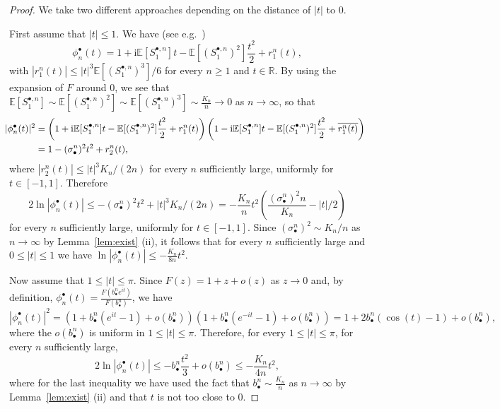 \documentclass[AHL,XML,longabstracts,Unicode]{cedram}
\newcommand{\E}{\mathbb{E}}
\newcommand{\R}{\mathbb{R}}
\def\bbn{b_{\bullet}^{n}}
\def\sbn{\sigma_{\bullet}^{n}}
\def\Sbn{S^{\bullet,n}}
\def\phibn{\phi^{\bullet}_{n}}
\begin{document}
\begin{proof}
We take two different approaches depending on the distance of $|t|$ to $0$.

First assume that $|t| \leq 1$. We have (see e.g.~\cite[Lemma 3.3.7]{Dur10})
\[\phibn(t)=1+\textrm{i}\E[\Sbn_{1}]t- \E[(\Sbn_{1})^{2}] \frac{t^{2}}{2}+r^{n}_{1}(t),\]
with $|r^{n}_{1}(t)| \leq |t|^{3} \E[(\Sbn_{1})^{3}]/6$ for every $n \geq 1$ and $t \in \R$. By using the expansion of $F$ around $0$, we see that $ \E[\Sbn_{1}] \sim \E[(\Sbn_{1})^{2}] \sim \E[(\Sbn_{1})^{3}] \sim \frac{K_{n}}{n} \rightarrow 0$ as $n \rightarrow \infty$, so that
\begin{align*}
  \hspace{ -2mm} |\phibn(t)|^{2} &= \left( 1+\textrm{i}\E[\Sbn_{1}]t- \E[(\Sbn_{1})^{2}] \frac{t^{2}}{2}+r^{n}_{1}(t) \right) \left( 1-\textrm{i}\E[\Sbn_{1}]t- \E[(\Sbn_{1})^{2}] \frac{t^{2}}{2}+\overline{r^{n}_{1}(t)} \right)\\
&= 1 - (\sbn)^{2} t^{2}+r^{n}_{2}(t),
\end{align*}
where $|r^{n}_{2}(t)| \leq  |t|^{3} K_{n}/(2n)$ for every $n$ sufficiently large, uniformly for $t \in [-1,1]$.
Therefore
\[ 2 \ln |\phibn(t)| \leq - (\sbn)^{2} t^{2}+ |t|^{3} K_{n}/(2n)= - \frac{K_{n}}{n} t^{2} \left(  \frac{(\sbn)^{2} n}{K_{n}}-|t|/2 \right)
\]
for every $n$ sufficiently large, uniformly for $t \in [-1,1]$.
Since $(\sbn)^{2} \sim K_{n}/n$ as $n \rightarrow \infty$ by Lemma~\ref{lem:exist} (ii), it follows that for every $n$ sufficiently large and $0 \leq |t| \leq 1$ we have $ \ln | \phibn (t)| \leq -  \frac{K_{n}}{ 8n} t^{2}$.

Now assume that $1 \leq |t| \leq \pi$. Since $F(z)=1+z+o(z)$ as $z \rightarrow 0$ and, by definition, $\phibn(t)=\tfrac{F( \bbn e^{it})}{F(\bbn)}$,
we have
\[|\phibn(t)|^{2}=(1+\bbn(e^{it}-1)+o(\bbn))(1+\bbn(e^{-it}-1)+o(\bbn))=1+2\bbn(\cos(t)-1)+o(\bbn),\]
where the $o(\bbn)$ is uniform in $1\leq |t| \leq \pi$.
Therefore, for every $1 \leq |t| \leq \pi$, for every $n$ sufficiently large,
\[ 2 \ln |\phibn(t)| \leq - \bbn \frac{t^{2}}{3}+o(\bbn) \leq - \frac{K_{n}}{4n} t^{2},\]
where for the last inequality we have used the fact that $\bbn \sim \frac{K_{n}}{n}$ as $n \rightarrow \infty$ by Lemma~\ref{lem:exist} (ii) and that $t$ is not too close to $0$.
\end{proof}
\end{document}
